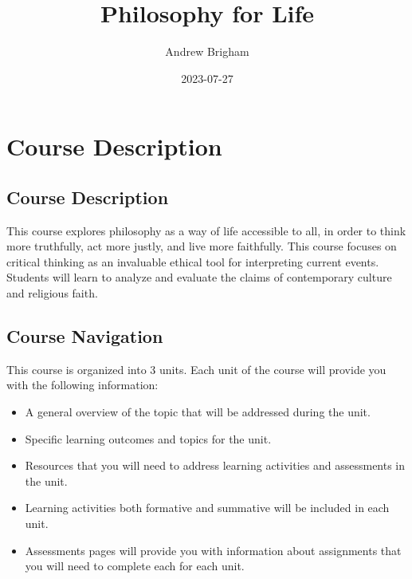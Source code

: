 \documentclass[
]{book}
\title{Philosophy for Life}
\author{Andrew Brigham}
\date{2023-07-27}
\providecommand{\tightlist}{%
  \setlength{\itemsep}{0pt}\setlength{\parskip}{0pt}}
\begin{document}
\maketitle

{
\setcounter{tocdepth}{1}
\tableofcontents
}
\hypertarget{course-description}{%
\chapter*{Course Description}\label{course-description}}

\hypertarget{course-description-1}{%
\section*{Course Description}\label{course-description-1}}

This course explores philosophy as a way of life accessible to all, in order to think more truthfully, act more justly, and live more faithfully. This course focuses on critical thinking as an invaluable ethical tool for interpreting current events. Students will learn to analyze and evaluate the claims of contemporary culture and religious faith.

\hypertarget{course-navigation}{%
\section*{Course Navigation}\label{course-navigation}}

This course is organized into 3 units. Each unit of the course will provide you with the following information:

\begin{itemize}
\tightlist
\item
  A general overview of the topic that will be addressed during the unit.\\
\item
  Specific learning outcomes and topics for the unit.\\
\item
  Resources that you will need to address learning activities and assessments in the unit.\\
\item
  Learning activities both formative and summative will be included in each unit.\\
\item
  Assessments pages will provide you with information about assignments that you will need to complete each for each unit.
\end{itemize}
\end{document}

